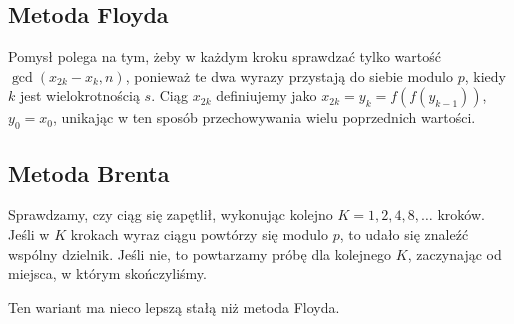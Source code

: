 \subsection{Metoda Floyda}
Pomysł polega na tym, żeby w każdym kroku sprawdzać tylko wartość \( \gcd(x_{2k} - x_k, n) \), ponieważ te dwa wyrazy przystają do siebie modulo \( p \), kiedy \( k \) jest wielokrotnością \( s \).
Ciąg \( x_{2k} \) definiujemy jako \( x_{2k} = y_k = f(f(y_{k-1})) \), \( y_0 = x_0 \), unikając w ten sposób przechowywania wielu poprzednich wartości.

\subsection{Metoda Brenta}
Sprawdzamy, czy ciąg się zapętlił, wykonując kolejno \( K = 1, 2, 4, 8, \dots \) kroków. Jeśli w \( K \) krokach wyraz ciągu powtórzy się modulo \( p \), to udało się znaleźć wspólny dzielnik. Jeśli nie, to powtarzamy próbę dla kolejnego \( K \), zaczynając od miejsca, w którym skończyliśmy.

Ten wariant ma nieco lepszą stałą niż metoda Floyda.
